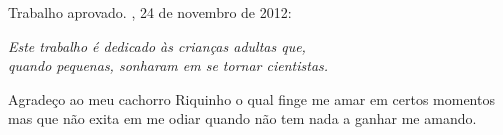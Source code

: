\begin{folhadeaprovacao}
	\begin{center}
	  {\ABNTEXchapterfont\large\imprimirautor}
	  \vspace*{\fill}\vspace*{\fill}
	  \begin{center}
		\ABNTEXchapterfont\bfseries\Large\imprimirtitulo
	  \end{center}
	  \vspace*{\fill}
	  \hspace{.45\textwidth}
	  \begin{minipage}{.5\textwidth}
		  \imprimirpreambulo
	  \end{minipage}%
	  \vspace*{\fill}
	 \end{center}
		  
	 Trabalho aprovado. \imprimirlocal, 24 de novembro de 2012:
  
		
	 \begin{center}
	  \vspace*{0.5cm}
	  {\large\imprimirlocal}
	  \par
	  {\large\imprimirdata}
	  \vspace*{1cm}
	\end{center}
	
\end{folhadeaprovacao}

\begin{dedicatoria}
	\vspace*{\fill}
	\centering
	\noindent
	\textit{ Este trabalho é dedicado às crianças adultas que,\\
	quando pequenas, sonharam em se tornar cientistas.} \vspace*{\fill}
\end{dedicatoria}

\begin{agradecimentos}
	Agradeço ao meu cachorro Riquinho o qual finge me amar em certos momentos mas que não exita em me odiar quando não tem nada a ganhar me amando.
\end{agradecimentos}

